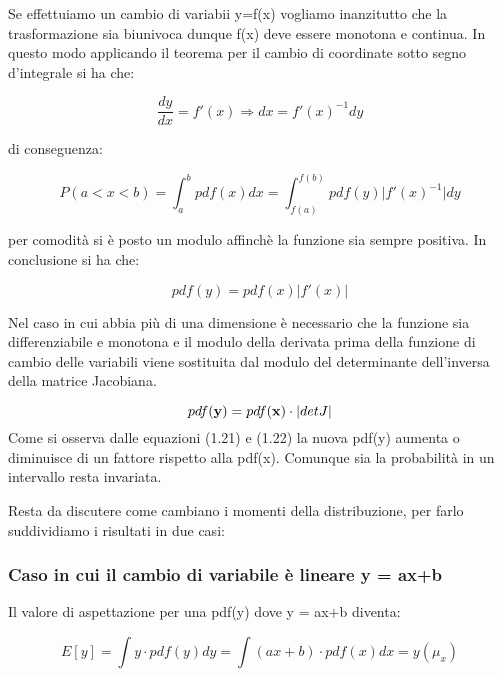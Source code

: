 Se effettuiamo un cambio di variabii y=f(x) vogliamo inanzitutto che la trasformazione sia biunivoca dunque f(x) deve essere monotona e continua. In questo modo applicando il teorema per il cambio di coordinate sotto segno d'integrale si ha che:

\begin{equation}
	\dfrac{dy}{dx} = f'(x) \Rightarrow dx = f'(x)^{-1}dy
\end{equation}

di conseguenza:

\begin{equation*}
	P(a < x< b) = \int_{a}^{b}{pdf(x)dx} = \int_{f(a)}^{f(b)}{pdf(y)\vert f'(x)^{-1}\vert dy}
\end{equation*}

per comodit\`{a} si \`{e} posto un modulo affinch\`{e} la funzione sia sempre positiva. In conclusione si ha che:

\begin{equation}
	pdf(y) = pdf(x)\vert f'(x) \vert
\end{equation}
 
 Nel caso in cui abbia pi\`{u} di una dimensione \`{e} necessario che la funzione sia differenziabile e monotona e il modulo della derivata prima della funzione di cambio delle variabili viene sostituita dal modulo del determinante dell'inversa della matrice Jacobiana.
 
 \begin{equation}
 	pdf(\bold{y}) = pdf(\bold{x}) \cdot \vert detJ \vert
 \end{equation}
\newline
\noindent Come si osserva dalle equazioni (1.21) e (1.22) la nuova pdf(y) aumenta o diminuisce di un fattore rispetto alla pdf(x). Comunque sia la probabilit\`{a} in un intervallo resta invariata.

Resta da discutere come cambiano i momenti della distribuzione, per farlo suddividiamo i risultati in due casi:

\subsubsection{Caso in cui il cambio di variabile \`{e} lineare y = ax+b}

Il valore di aspettazione per una pdf(y) dove y = ax+b diventa:

\begin{equation}
	E[y] = \int{y\cdot pdf(y)dy} = \int{(ax+b) \cdot pdf(x)dx = y(\mu_x)}
\end{equation}
 
